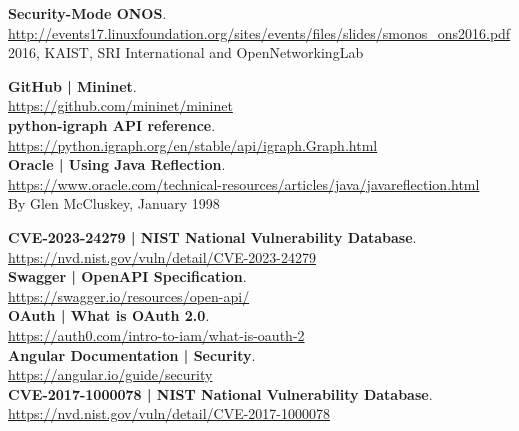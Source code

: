 \documentclass[a4paper,10pt]{memoir}
\begin{document}
{\begin{thebibliography}{9}
  \textbf{Security-Mode ONOS}.\\
  \href{http://events17.linuxfoundation.org/sites/events/files/slides/smonos_ons2016.pdf}{http://events17.linuxfoundation.org/sites/events/files/slides/smonos\_ons2016.pdf}\\
  2016, KAIST, SRI International and OpenNetworkingLab

  \textbf{GitHub | Mininet}.\\
  \href{https://github.com/mininet/mininet}{https://github.com/mininet/mininet}\\

  \textbf{python-igraph API reference}.\\
  \href{https://python.igraph.org/en/stable/api/igraph.Graph.html}{https://python.igraph.org/en/stable/api/igraph.Graph.html}\\

  \textbf{Oracle | Using Java Reflection}.\\
  \href{https://www.oracle.com/technical-resources/articles/java/javareflection.html}{https://www.oracle.com/technical-resources/articles/java/javareflection.html}\\
  By Glen McCluskey, January 1998

  \textbf{CVE-2023-24279 | NIST National Vulnerability Database}.\\
  \href{https://nvd.nist.gov/vuln/detail/CVE-2023-24279}{https://nvd.nist.gov/vuln/detail/CVE-2023-24279}\\

  \textbf{Swagger | OpenAPI Specification}.\\
  \href{https://swagger.io/resources/open-api/}{https://swagger.io/resources/open-api/}\\

  \textbf{OAuth | What is OAuth 2.0}.\\
  \href{https://auth0.com/intro-to-iam/what-is-oauth-2}{https://auth0.com/intro-to-iam/what-is-oauth-2}\\

  \textbf{Angular Documentation | Security}.\\
  \href{https://angular.io/guide/security}{https://angular.io/guide/security}\\

  \textbf{CVE-2017-1000078 | NIST National Vulnerability Database}.\\
  \href{https://nvd.nist.gov/vuln/detail/CVE-2017-1000078}{https://nvd.nist.gov/vuln/detail/CVE-2017-1000078}\\


\end{thebibliography}}
\end{document}

